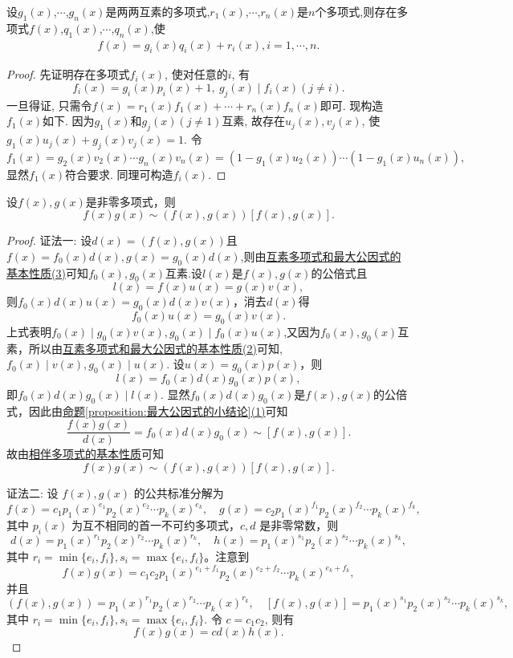 \documentclass[../../main.tex]{subfiles}
\begin{document}
\begin{theorem}[中国剩余定理]\label{theorem:中国剩余定理}
设$g_1(x)$,$\cdots$,$g_n(x)$是两两互素的多项式,$r_1(x)$,$\cdots$,$r_n(x)$是$n$个多项式,则存在多项式$f(x)$,$q_1(x)$,$\cdots$,$q_n(x)$,使
\begin{align*}
f(x)=g_i(x)q_i(x)+r_i(x),i = 1,\cdots,n.  
\end{align*}
\end{theorem}
\begin{proof}
先证明存在多项式\(f_i(x)\), 使对任意的\(i\), 有
\[
f_i(x)=g_i(x)p_i(x)+1,\ g_j(x)\mid f_i(x)(j\neq i).
\]
一旦得证, 只需令\(f(x)=r_1(x)f_1(x)+\cdots+r_n(x)f_n(x)\)即可. 现构造\(f_1(x)\)如下. 因为\(g_1(x)\)和\(g_j(x)(j\neq 1)\)互素, 故存在\(u_j(x),v_j(x)\), 使\(g_1(x)u_j(x)+g_j(x)v_j(x)=1\). 令
\[
f_1(x)=g_2(x)v_2(x)\cdots g_n(x)v_n(x)=(1 - g_1(x)u_2(x))\cdots(1 - g_1(x)u_n(x)),
\]
显然\(f_1(x)\)符合要求. 同理可构造\(f_i(x)\). 
\end{proof}

\begin{proposition}[两个多项式的乘积与其最大公因式和最小公倍式的乘积相伴]\label{proposition:两个多项式的乘积与其最大公因式和最小公倍式的乘积相伴}
设\(f(x),g(x)\)是非零多项式，则
\[
f(x)g(x)\sim(f(x),g(x))[f(x),g(x)].
\]
\end{proposition}
\begin{proof}
{\color{blue}证法一:}
设\(d(x)=(f(x),g(x))\)且\(f(x)=f_0(x)d(x),g(x)=g_0(x)d(x)\),则由\hyperref[proposition:互素多项式和最大公因式的基本性质]{互素多项式和最大公因式的基本性质(3)}可知\(f_0(x),g_0(x)\)互素.设\(l(x)\)是\(f(x),g(x)\)的公倍式且
\[
l(x)=f(x)u(x)=g(x)v(x),
\]
则\(f_0(x)d(x)u(x)=g_0(x)d(x)v(x)\)，消去\(d(x)\)得
\[
f_0(x)u(x)=g_0(x)v(x).
\]
上式表明$f_0(x)\mid g_0(x)v(x),g_0(x)\mid f_0(x)u(x)$,又因为\(f_0(x),g_0(x)\)互素，所以由\hyperref[proposition:互素多项式和最大公因式的基本性质]{互素多项式和最大公因式的基本性质(2)}可知,\(f_0(x)\mid v(x),g_0(x)\mid u(x)\). 设\(u(x)=g_0(x)p(x)\)，则
\[
l(x)=f_0(x)d(x)g_0(x)p(x),
\]
即\(f_0(x)d(x)g_0(x)\mid l(x)\). 显然\(f_0(x)d(x)g_0(x)\)是\(f(x),g(x)\)的公倍式，因此由\hyperref[proposition:最大公因式的小结论]{命题\ref{proposition:最大公因式的小结论}(1)}可知
\[
\frac{f(x)g(x)}{d(x)}=f_0(x)d(x)g_0(x)\sim[f(x),g(x)].
\]
故由\hyperref[proposition:相伴多项式的基本性质]{相伴多项式的基本性质}可知
\[
f(x)g(x)\sim(f(x),g(x))[f(x),g(x)].
\]

{\color{blue}证法二:}
设 \(f(x), g(x)\) 的公共标准分解为
\[
f(x) = c_1 p_1(x)^{e_1}p_2(x)^{e_2} \cdots p_k(x)^{e_k}, \quad g(x) = c_2 p_1(x)^{f_1}p_2(x)^{f_2} \cdots p_k(x)^{f_k},
\]
其中 \(p_i(x)\) 为互不相同的首一不可约多项式，\(c, d\) 是非零常数，则
\[
d(x) = p_1(x)^{r_1}p_2(x)^{r_2} \cdots p_k(x)^{r_k}, \quad h(x) = p_1(x)^{s_1}p_2(x)^{s_2} \cdots p_k(x)^{s_k},
\]
其中 \(r_i = \min\{e_i, f_i\}, s_i = \max\{e_i, f_i\}\)。注意到
\[
f(x)g(x) = c_1c_2 p_1(x)^{e_1 + f_1}p_2(x)^{e_2 + f_2} \cdots p_k(x)^{e_k + f_k},
\]
并且
\[
(f(x), g(x)) = p_1(x)^{r_1}p_2(x)^{r_2} \cdots p_k(x)^{r_k}, \quad [f(x), g(x)] = p_1(x)^{s_1}p_2(x)^{s_2} \cdots p_k(x)^{s_k},
\]
其中 \(r_i = \min\{e_i, f_i\}, s_i = \max\{e_i, f_i\}\). 令 \(c = c_1c_2\), 则有
\[
f(x)g(x) = cd(x)h(x).
\]
\end{proof}
\end{document}
